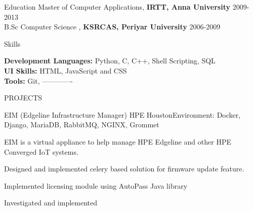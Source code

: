 \documentclass{resume} %
\begin{document}

\begin{rSection}{Education}
{ Master of Computer Applications, \textbf{IRTT, Anna University}} \hfill {2009-2013}
\\
{ B.Sc Computer Science , \textbf{KSRCAS, Periyar University}} \hfill {2006-2009}

  


\end{rSection} 


\begin{rSection}{Skills} \itemsep -3pt  

{\textbf{Development Languages:} Python, C, C++, Shell Scripting, SQL }  \\
{\textbf{UI Skills:} HTML, JavaScript and CSS } \\
{\textbf{Tools:} Git, ------------- } 
\end{rSection}  
 








\begin{rSection}{PROJECTS}


\begin{rSubsection}{EIM (Edgeline Infrastructure Manager)}
{HPE Houston}{Environment: Docker, Django,  MariaDB, RabbitMQ, NGINX, Grommet}{ }  %

\vspace{-3pt}

\item EIM is a virtual appliance to help manage HPE Edgeline and other HPE Converged IoT systems.
\item Designed and implemented celery based solution for firmware update feature.
\item Implemented licensing module using AutoPass Java library
\item Investigated and implemented 

\end{rSubsection}




\end{rSection} 
\end{document}
